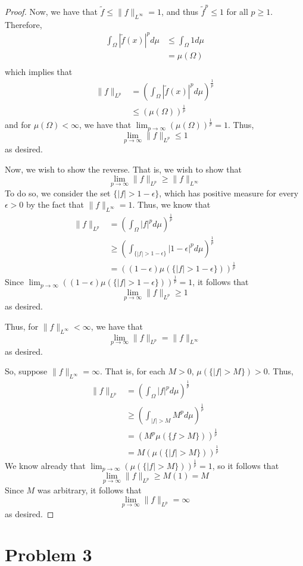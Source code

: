 \documentclass[fontsize=11pt]{scrartcl} %
\numberwithin{equation}{section} %
\numberwithin{figure}{section} %
\numberwithin{table}{section} %
\begin{document}
\begin{proof}
    Now, we have that $\tilde{f} \leq \|f\|_{L^{\infty}} = 1$, and thus
    $\tilde{f}^p\leq 1$ for all $p\geq 1$. Therefore,
    \[
        \begin{aligned}
            \int_{\Omega}|\tilde{f}(x)|^pd\mu &\leq \int_{\Omega}1d\mu\\
                                            &=\mu(\Omega)\\
        \end{aligned}
    \]
    which implies that
    \[
        \begin{aligned}
        \|f\|_{L^p} &=
        \left(\int_{\Omega}|\tilde{f}(x)|^pd\mu\right)^{\frac{1}{p}}\\
            &\leq (\mu(\Omega))^{\frac{1}{p}}
        \end{aligned}
    \]
    and for $\mu(\Omega)<\infty$, we have that
    $\lim_{p\to\infty}(\mu(\Omega))^{\frac{1}{p}} = 1$.
    Thus,
    \[
        \lim_{p\to\infty}\|f\|_{L^p} \leq 1
    \]
    as desired.

    Now, we wish to show the reverse. That is, we wish to show that
    \[
        \lim_{p\to\infty}\|f\|_{L^p} \geq \|f\|_{L^{\infty}}
    \]
    To do so, we consider the set $\{|f|>1-\epsilon\}$, which has positive
    measure for every $\epsilon>0$ by the fact that $\|f\|_{L^{\infty}} = 1$.
    Thus, we know that
    \[
        \begin{aligned}
            \|f\|_{L^p} &=\left(\int_{\Omega}|f|^pd\mu\right)^{\frac{1}{p}}\\
                        &\geq
                        \left(\int_{\{|f|>1-\epsilon\}}|1-\epsilon|^pd\mu\right)^{\frac{1}{p}}\\
                        &=((1-\epsilon)\mu(\{|f|>1-\epsilon\}))^{\frac{1}{p}}
        \end{aligned}
    \]
    Since $\lim_{p\to\infty}((1-\epsilon)\mu(\{|f|>1-\epsilon\}))^{\frac{1}{p}}
    = 1$, it follows that
    \[
        \lim_{p\to\infty}\|f\|_{L^p} \geq 1
    \]
    as desired.

    Thus, for $\|f\|_{L^{\infty}} < \infty$, we have that
    \[
        \lim_{p\to\infty}\|f\|_{L^p} = \|f\|_{L^{\infty}}
    \]
    as desired.

    So, suppose $\|f\|_{L^{\infty}} = \infty$. That is, for each $M>0$,
    $\mu(\{|f|>M\})>0$. Thus,
    \[
        \begin{aligned}
            \|f\|_{L^p} &= \left(\int_{\Omega}|f|^pd\mu\right)^{\frac{1}{p}}\\
                        &\geq \left(\int_{|f|>M}M^pd\mu\right)^{\frac{1}{p}}\\
                        &= \left(M^p\mu(\{f>M\})\right)^{\frac{1}{p}}\\
                        &= M(\mu(\{|f|>M\}))^{\frac{1}{p}}
        \end{aligned}
    \]
    We know already that $\lim_{p\to\infty}(\mu(\{|f|>M\}))^{\frac{1}{p}} = 1$,
    so it follows that
    \[
        \lim_{p\to\infty}\|f\|_{L^p} \geq M(1) = M
    \]
    Since $M$ was arbitrary, it follows that
    \[
        \lim_{p\to\infty}\|f\|_{L^p} = \infty
    \]
    as desired.
\end{proof}

\newpage

\section*{Problem 3}
\end{document}
